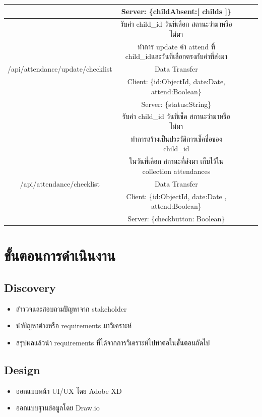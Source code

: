 \begin{flushleft}
\begin{tabular}{|c|c|c|c|c|}
  \\ &   Server: \{childAbsent:[ childs ]\}

  \\ 
  \hline

  \hline
   & รับค่า child\_id วันที่เลือก สถานะว่ามาหรือไม่มา
  \\
  & ทำการ update ค่า attend ที่ child\_idและวันที่เลือกตรงกับค่าที่ส่งมา
  \\  
  {/api/attendance/update/checklist}& Data Transfer
  \\ &   Client: \{id:ObjectId, date:Date, attend:Boolean\}
  \\ &   Server: \{status:String\}
  \\ 
  \hline

  \hline
   & รับค่า child\_id วันที่เช็ค สถานะว่ามาหรือไม่มา
   
  \\
  & ทำการสร้างเป็นประวัติการเช็คชื่อของ child\_id
  \\ 
  & ในวันที่เลือก สถานะที่ส่งมา เก็บไว้ใน collection attendances
  
  \\
  {/api/attendance/checklist}& Data Transfer
  \\ &   Client: \{id:ObjectId, date:Date , attend:Boolean\}
  \\ &   Server: \{checkbutton: Boolean\}
  \\ 
  \hline

  \end{tabular}
\end{flushleft}
\section{ขั้นตอนการดำเนินงาน}
\subsection{Discovery}
\begin{itemize}
  \item สำรวจและสอบถามปัญหาจาก stakeholder
  \item นำปัญหาต่างหรือ requirements มาวิเคราะห์
  \item สรุปผลแล้วนำ requirements ที่ได้จากการวิเคราะห์ไปทำต่อในขั้นตอนถัดไป
\end{itemize}

\subsection{Design}
\begin{itemize}
  \item ออกแบบหน้า UI/UX โดย Adobe XD
  \item ออกแบบฐานข้อมูลโดย Draw.io
\end{itemize}

